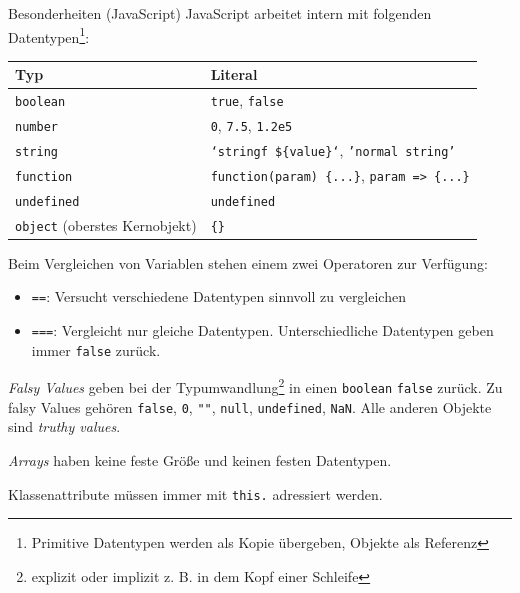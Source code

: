 \begin{bonus}{Besonderheiten (JavaScript)}
    JavaScript arbeitet intern mit folgenden Datentypen\footnote{Primitive Datentypen werden als Kopie übergeben, Objekte als Referenz}:

    \begin{tabular}{|l|l|}
        \hline
        Typ                                   & Literal                                                     \\\hline\hline
        \texttt{boolean}                      & \texttt{true}, \texttt{false}                               \\\hline
        \texttt{number}                       & \texttt{0}, \texttt{7.5}, \texttt{1.2e5}                    \\\hline
        \texttt{string}                       & \texttt{`stringf \$\{value\}`}, \texttt{'normal string'}    \\\hline %
        \texttt{function}                     & \texttt{function(param) \{...\}}, \texttt{param => \{...\}} \\\hline
        \texttt{undefined}                    & \texttt{undefined}                                          \\\hline
        \texttt{object} (oberstes Kernobjekt) & \texttt{\{\}}                                               \\\hline
    \end{tabular}

    Beim Vergleichen von Variablen stehen einem zwei Operatoren zur Verfügung:
    \begin{itemize}
        \item \texttt{==}: Versucht verschiedene Datentypen sinnvoll zu vergleichen
        \item \texttt{===}: Vergleicht nur gleiche Datentypen.
              Unterschiedliche Datentypen geben immer \texttt{false} zurück.
    \end{itemize}

    \emph{Falsy Values} geben bei der Typumwandlung\footnote{explizit oder implizit z. B. in dem Kopf einer Schleife} in einen \texttt{boolean} \texttt{false} zurück.
    Zu falsy Values gehören \texttt{false}, \texttt{0}, \texttt{""}, \texttt{null}, \texttt{undefined}, \texttt{NaN}.
    Alle anderen Objekte sind \emph{truthy values}.

    \emph{Arrays} haben keine feste Größe und keinen festen Datentypen.

    Klassenattribute müssen immer mit \texttt{this.} adressiert werden.
\end{bonus}

